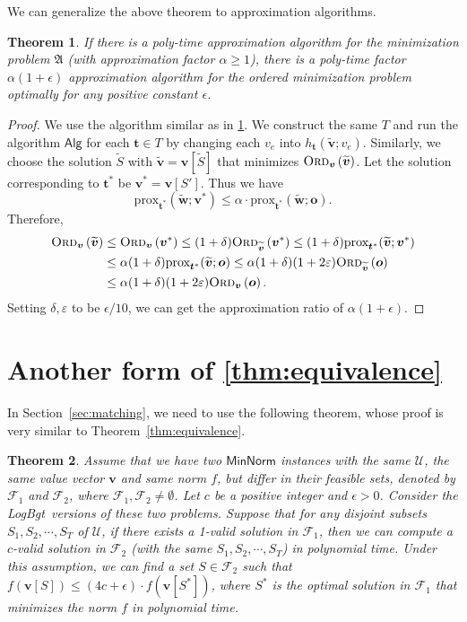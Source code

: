 \documentclass[11pt,a4paper]{article} \usepackage{enumitem}
\newcommand{\calF}{\mathcal{F}}
\newcommand{\calU}{\mathcal{U}}
\newcommand{\ww}{\boldsymbol{\widetilde{w}}}
\newcommand{\boldv}{\boldsymbol{v}}
\newcommand{\boldt}{\boldsymbol{t}}
\newcommand{\minnorm}{\textsf{MinNorm}}
\newcommand{\LBO}{\textsf{LogBgt}}
\newcommand{\myproblem}{\mathfrak{A}}
\newcommand{\Algo}{\mathsf{Alg}}
\newcommand{\ordered}[2]{\textsc{Ord}_{#1}\left(#2\right)}
\newtheorem{theorem}{Theorem}[section]
\theoremstyle{definition}
\begin{document}
We can generalize the above theorem to approximation algorithms.

\begin{theorem}
\label{thm:C3}
If there is a poly-time approximation algorithm for the minimization problem $\myproblem$ (with approximation factor $\alpha\geq 1$), 
there is a poly-time factor $\alpha(1+\epsilon)$ approximation algorithm for the ordered {\em minimization} problem optimally for any positive constant $\epsilon$.
\end{theorem}
\begin{proof}
We use the algorithm similar as in \cref{thm:C3}. We construct the same $T$ and run the algorithm $\Algo$ for each $\boldt\in T$ by changing each $v_e$ into $h_{\boldt}(\widetilde{\boldv};v_e)$. 
Similarly, we choose the solution $\widetilde{S}$ with $\widetilde{\boldv}=\boldv[\widetilde{S}]$ that minimizes $\ordered{\boldv}{\widetilde{\boldv}}$. Let the solution corresponding to $\boldsymbol{t}^*$ be $\boldv^*=\boldv[S']$. Thus we have
$$\text{prox}_{\boldsymbol{t}^*}(\ww;\boldv^*)\leq \alpha\cdot\text{prox}_{\boldsymbol{t}^*}(\ww;\boldsymbol{o}).$$
Therefore,
\begin{align*}
    \ordered{\boldv}{\widetilde{\boldv}}&\leq\ordered{\boldv}{\boldv^*}\leq (1+\delta)\ordered{\widetilde{\boldv}}{\boldv^*}\leq (1+\delta)\text{prox}_{\boldsymbol{t}^*}(\widetilde{\boldv};\boldv^*)\\
    &\leq \alpha(1+\delta)\text{prox}_{\boldsymbol{t}^*}(\widetilde{\boldv};\boldsymbol{o})\leq \alpha(1+\delta)(1+2\varepsilon)\ordered{\widetilde{\boldv}}{\boldsymbol{o}}\\
    &\leq \alpha(1+\delta)(1+2\varepsilon)\ordered{\boldv}{\boldsymbol{o}}.
\end{align*}
Setting $\delta,\varepsilon$ to be $\epsilon/10$, 
we can get the approximation ratio of
$\alpha(1+\epsilon)$.
\end{proof}



\section{Another form of \cref{thm:equivalence}}
\label{sec4:proof}
In Section~\ref{sec:matching}, we need to use the following theorem, whose proof is very similar to Theorem~\ref{thm:equivalence}.

\begin{theorem}
\label{thm:diffequiv}
Assume that we have two $\minnorm$ instances with the same $\calU$, the same value vector $\boldv$ and same norm $f$, but differ in their feasible sets, denoted by $\calF_1$ and $\calF_2$, where $\calF_1,\calF_2\neq \emptyset$.
Let $c$ be a positive integer and $\epsilon>0$. 
Consider the \LBO\ versions of these two problems.
Suppose that for any disjoint subsets $S_1,S_2,\cdots,S_T$ of $\calU$, if there exists a 1-valid solution in $\calF_1$, then we can compute a $c$-valid solution in $\calF_2$
(with the same $S_1,S_2,\cdots,S_T$) in polynomial time.
Under this assumption, we can find a set $S\in\calF_2$ such that $f(\boldv[S])\leq (4c+\epsilon)\cdot f(\boldv[S^*])$, where $S^*$ is the optimal solution in $\calF_1$ that minimizes the norm $f$ in polynomial time.
\end{theorem}
\end{document}
